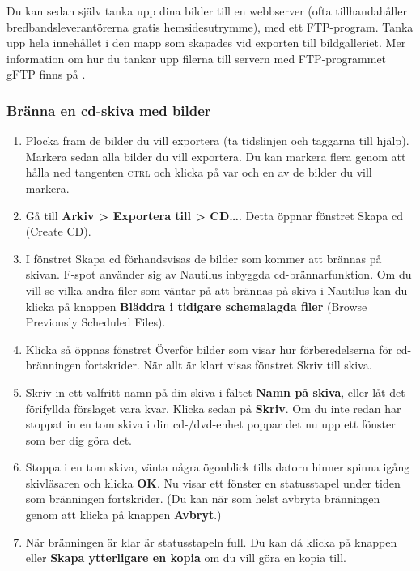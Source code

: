 \documentclass[a4paper,final]{memoir} %
\begin{document}
Du kan sedan själv tanka upp dina bilder till en webbserver (ofta tillhandahåller bredbandsleverantörerna gratis hemsidesutrymme), med ett FTP-program. Tanka upp hela innehållet i den mapp som skapades vid exporten till bildgalleriet. Mer information om hur du tankar upp filerna till servern med FTP-programmet gFTP finns på .


\subsubsection{Bränna en cd-skiva med bilder}


\begin{enumerate}

\item Plocka fram de bilder du vill exportera (ta tidslinjen och taggarna till hjälp). Markera sedan alla bilder du vill exportera. Du kan markera flera genom att hålla ned tangenten \textsc{ctrl} och klicka på var och en av de bilder du vill markera.

\item Gå till \textbf{Arkiv \textgreater{} Exportera till \textgreater{} CD\ldots{}}. Detta öppnar fönstret Skapa cd (Create CD).

\item I fönstret Skapa cd förhandsvisas de bilder som kommer att brännas på skivan. F-spot använder sig av Nautilus inbyggda cd-brännarfunk\-tion. Om du vill se vilka andra filer som väntar på att brännas på skiva i Nautilus kan du klicka på knappen \textbf{Bläddra i tidigare schemalagda filer} (Browse Previously Scheduled Files).

\item Klicka \xok{} så öppnas fönstret Överför bilder som visar hur förberedelserna för cd-bränningen fortskrider. När allt är klart visas fönstret Skriv till skiva.

\item Skriv in ett valfritt namn på din skiva i fältet \textbf{Namn på skiva}, eller låt det förifyllda förslaget vara kvar. Klicka sedan på \textbf{Skriv}. Om du inte redan har stoppat in en tom skiva i din cd-/dvd-enhet poppar det nu upp ett fönster som ber dig göra det.

\item Stoppa i en tom skiva, vänta några ögonblick tills datorn hinner spinna igång skivläsaren och klicka \textbf{OK}. Nu visar ett fönster en statusstapel under tiden som bränningen fortskrider. (Du kan när som helst avbryta bränningen genom att klicka på knappen \textbf{Avbryt}.)

\item När bränningen är klar är statusstapeln full. Du kan då klicka på knappen \xstang{} eller \textbf{Skapa ytterligare en kopia} om du vill göra en kopia till.

\end{enumerate}
\end{document}
